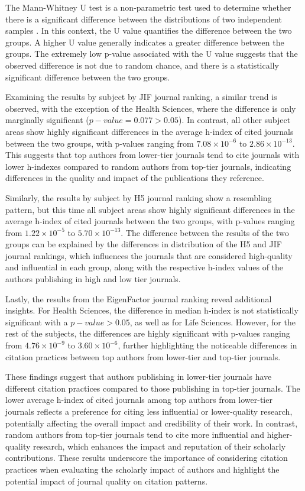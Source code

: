 The Mann-Whitney U test is a non-parametric test used to determine whether
there is a significant difference between the distributions of two independent
samples \cite{mann1947test}. In this context, the U value quantifies the
difference between the two groups. A higher U value generally indicates a
greater difference between the groups. The extremely low p-value associated
with the U value suggests that the observed difference is not due to random
chance, and there is a statistically significant difference between the two
groups.

Examining the results by subject by JIF journal ranking, a similar trend is
observed, with the exception of the Health Sciences, where the difference is
only marginally significant ($p-value = 0.077 > 0.05$). In contrast, all other
subject areas show highly significant differences in the average h-index of
cited journals between the two groups, with p-values ranging from $7.08 \times
    10^{-6}$ to $2.86 \times 10^{-13}$. This suggests that top authors from
lower-tier journals tend to cite journals with lower h-indexes compared to
random authors from top-tier journals, indicating differences in the quality
and impact of the publications they reference.

Similarly, the results by subject by H5 journal ranking show a resembling
pattern, but this time all subject areas show highly significant differences in
the average h-index of cited journals between the two groups, with p-values
ranging from $1.22 \times 10^{-5}$ to $5.70 \times 10^{-13}$. The difference
between the results of the two groups can be explained by the differences in
distribution of the H5 and JIF journal rankings, which influences the journals
that are considered high-quality and influential in each group, along with the
respective h-index values of the authors publishing in high and low tier
journals.

Lastly, the results from the EigenFactor journal ranking reveal additional
insights. For Health Sciences, the difference in median h-index is not
statistically significant with a $p-value > 0.05$, as well as for Life
Sciences. However, for the rest of the subjects, the differences are highly
significant with p-values ranging from $4.76 \times 10^{-9}$ to $3.60 \times
    10^{-6}$, further highlighting the noticeable differences in citation practices
between top authors from lower-tier and top-tier journals.

These findings suggest that authors publishing in lower-tier journals have
different citation practices compared to those publishing in top-tier journals.
The lower average h-index of cited journals among top authors from lower-tier
journals reflects a preference for citing less influential or lower-quality
research, potentially affecting the overall impact and credibility of their
work. In contrast, random authors from top-tier journals tend to cite more
influential and higher-quality research, which enhances the impact and
reputation of their scholarly contributions. These results underscore the
importance of considering citation practices when evaluating the scholarly
impact of authors and highlight the potential impact of journal quality on
citation patterns.

